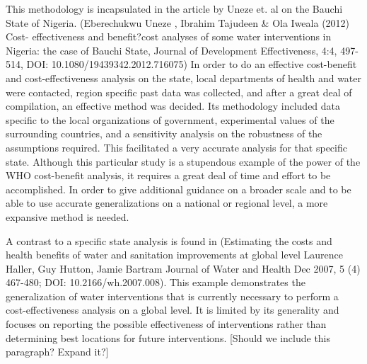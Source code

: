 This methodology is incapsulated in the article by Uneze et. al on the Bauchi State of Nigeria. (Eberechukwu Uneze , Ibrahim Tajudeen \& Ola Iweala (2012) Cost- effectiveness and benefit?cost analyses of some water interventions in Nigeria: the case of Bauchi State, Journal of Development Effectiveness, 4:4, 497-514, DOI: 10.1080/19439342.2012.716075)
In order to do an effective cost-benefit and cost-effectiveness analysis on the state, local departments of health and water were contacted, region specific past data was collected, and after a great deal of compilation, an effective method was decided.
Its methodology included data specific to the local organizations of government, experimental values of the surrounding countries, and a sensitivity analysis on the robustness of the assumptions required.
This facilitated a very accurate analysis for that specific state.
Although this particular study is a stupendous example of the power of the WHO cost-benefit analysis, it requires a great deal of time and effort to be accomplished.
In order to give additional guidance on a broader scale and to be able to use accurate generalizations on a national or regional level, a more expansive method is needed.

A contrast to a specific state analysis is found in (Estimating the costs and health benefits of water and sanitation improvements at global level Laurence Haller, Guy Hutton, Jamie Bartram Journal of Water and Health Dec 2007, 5 (4) 467-480; DOI: 10.2166/wh.2007.008).
This example demonstrates the generalization of water interventions that is currently necessary to perform a cost-effectiveness analysis on a global level.
It is limited by its generality and focuses on reporting the possible effectiveness of interventions rather than determining best locations for future interventions.
[Should we include this paragraph? Expand it?]